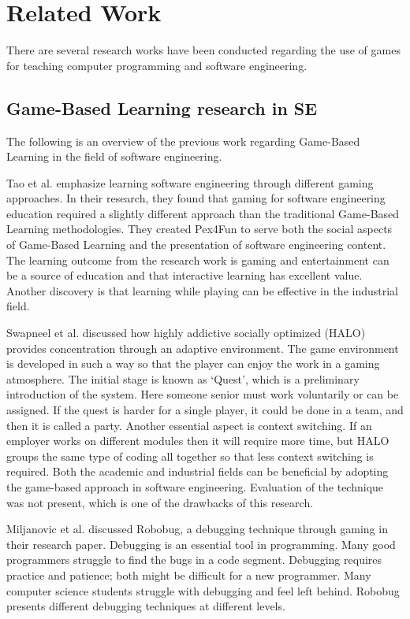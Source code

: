 \section[Related Work]{Related Work}
\label{sec:Related Work}

There are several research works have been conducted regarding the use of games for teaching computer programming and software engineering.

\subsection{Game-Based Learning research in SE}
The following is an overview of the previous work regarding Game-Based Learning in the field of software engineering.

Tao et al. \cite{educational} emphasize learning software engineering through different gaming approaches. In their research, they found that gaming for software engineering education required a slightly different approach than the traditional Game-Based Learning methodologies. They created Pex4Fun to serve both the social aspects of Game-Based Learning and the presentation of software engineering content. The learning outcome from the research work is gaming and entertainment can be a source of education and that interactive learning has excellent value. Another discovery is that learning while playing can be effective in the industrial field.

Swapneel et al. \cite{halo} discussed how highly addictive socially optimized (HALO) provides concentration through an adaptive environment. The game environment is developed in such a way so that the player can enjoy the work in a gaming atmosphere. The initial stage is known as ‘Quest’, which is a preliminary introduction of the system. Here someone senior must work voluntarily or can be assigned. If the quest is harder for a single player, it could be done in a team, and then it is called a party. Another essential aspect is context switching. If an employer works on different modules then it will require more time, but HALO groups the same type of coding all together so that less context switching is required. Both the academic and industrial fields can be beneficial by adopting the game-based approach in software engineering.  Evaluation of the technique was not present, which is one of the drawbacks of this research.  

Miljanovic et al. \cite{robobug} discussed Robobug, a debugging technique through gaming in their research paper. Debugging is an essential tool in programming. Many good programmers struggle to find the bugs in a code segment. Debugging requires practice and patience; both might be difficult for a new programmer. Many computer science students struggle with debugging and feel left behind. Robobug presents different debugging techniques at different levels.

